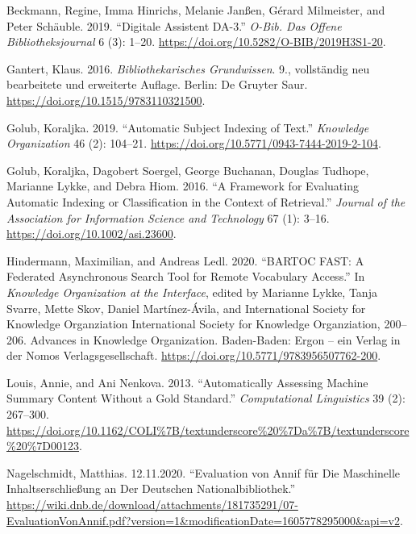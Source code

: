 \hypertarget{refs}{}
\begin{CSLReferences}{1}{0}
\leavevmode\hypertarget{ref-Beckmann.2019}{}%
Beckmann, Regine, Imma Hinrichs, Melanie Janßen, Gérard Milmeister, and
Peter Schäuble. 2019. {``Digitale Assistent DA-3.''} \emph{O-Bib. Das
Offene Bibliotheksjournal} 6 (3): 1--20.
\url{https://doi.org/10.5282/O-BIB/2019H3S1-20}.

\leavevmode\hypertarget{ref-Gantert.2016}{}%
Gantert, Klaus. 2016. \emph{Bibliothekarisches Grundwissen}. 9.,
vollst{ä}ndig neu bearbeitete und erweiterte Auflage. Berlin: {De
Gruyter Saur}. \url{https://doi.org/10.1515/9783110321500}.

\leavevmode\hypertarget{ref-Golub.2019}{}%
Golub, Koraljka. 2019. {``Automatic Subject Indexing of Text.''}
\emph{Knowledge Organization} 46 (2): 104--21.
\url{https://doi.org/10.5771/0943-7444-2019-2-104}.

\leavevmode\hypertarget{ref-Golub.2016}{}%
Golub, Koraljka, Dagobert Soergel, George Buchanan, Douglas Tudhope,
Marianne Lykke, and Debra Hiom. 2016. {``A Framework for Evaluating
Automatic Indexing or Classification in the Context of Retrieval.''}
\emph{Journal of the Association for Information Science and Technology}
67 (1): 3--16. \url{https://doi.org/10.1002/asi.23600}.

\leavevmode\hypertarget{ref-Hindermann.2020}{}%
Hindermann, Maximilian, and Andreas Ledl. 2020. {``BARTOC FAST: A
Federated Asynchronous Search Tool for Remote Vocabulary Access.''} In
\emph{Knowledge Organization at the Interface}, edited by Marianne
Lykke, Tanja Svarre, Mette Skov, Daniel Martínez-Ávila, and
International Society for Knowledge Organziation International Society
for Knowledge Organziation, 200--206. Advances in Knowledge
Organization. Baden-Baden: {Ergon -- ein Verlag in der Nomos
Verlagsgesellschaft}. \url{https://doi.org/10.5771/9783956507762-200}.

\leavevmode\hypertarget{ref-Louis.2013}{}%
Louis, Annie, and Ani Nenkova. 2013. {``Automatically Assessing Machine
Summary Content Without a Gold Standard.''} \emph{Computational
Linguistics} 39 (2): 267--300.
\url{https://doi.org/10.1162/COLI\%7B/textunderscore\%20\%7Da\%7B/textunderscore\%20\%7D00123}.

\leavevmode\hypertarget{ref-Nagelschmidt.12.11.2020}{}%
Nagelschmidt, Matthias. 12.11.2020. {``Evaluation von Annif f{ü}r Die
Maschinelle Inhaltserschlie{ß}ung an Der Deutschen
Nationalbibliothek.''}
\url{https://wiki.dnb.de/download/attachments/181735291/07-EvaluationVonAnnif.pdf?version=1\&modificationDate=1605778295000\&api=v2}.


\end{CSLReferences}
